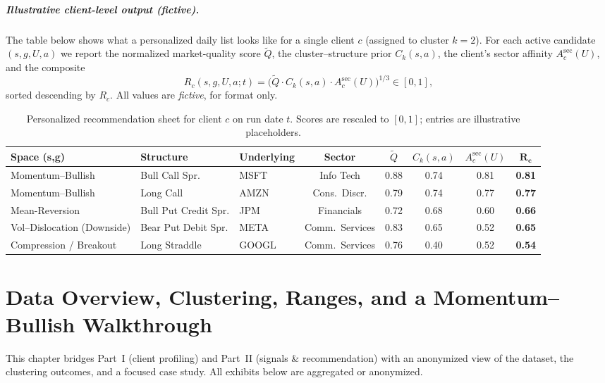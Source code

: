 \documentclass[12pt,a4paper]{report}
\begin{document}
\paragraph{Illustrative client-level output (fictive).}
The table below shows what a personalized daily list looks like for a single client $c$ (assigned to cluster $k=2$). For each active candidate $(s,g,U,a)$ we report the normalized market-quality score $\widetilde{Q}$, the cluster–structure prior $C_{k}(s,a)$, the client’s sector affinity $A^{\mathrm{sec}}_c(U)$, and the composite
\[
R_c(s,g,U,a;t)=\big(\widetilde{Q}\cdot C_{k}(s,a)\cdot A^{\mathrm{sec}}_c(U)\big)^{1/3}\in[0,1],
\]
sorted descending by $R_c$. All values are \emph{fictive}, for format only.

\begin{table}[h]
\centering
\begin{tabular}{lllc cccc}
\toprule
\textbf{Space (s,g)} & \textbf{Structure} & \textbf{Underlying} & \textbf{Sector} & $\widetilde{Q}$ & $C_{k}(s,a)$ & $A^{\mathrm{sec}}_c(U)$ & $\mathbf{R_c}$ \\
\midrule
Momentum–Bullish & Bull Call Spr. & MSFT & Info Tech & 0.88 & 0.74 & 0.81 & \textbf{0.81} \\
Momentum–Bullish & Long Call      & AMZN & Cons.\ Discr. & 0.79 & 0.74 & 0.77 & \textbf{0.77} \\
Mean-Reversion   & Bull Put Credit Spr. & JPM  & Financials & 0.72 & 0.68 & 0.60 & \textbf{0.66} \\
Vol–Dislocation (Downside) & Bear Put Debit Spr. & META & Comm.\ Services & 0.83 & 0.65 & 0.52 & \textbf{0.65} \\
Compression / Breakout & Long Straddle & GOOGL & Comm.\ Services & 0.76 & 0.40 & 0.52 & \textbf{0.54} \\
\bottomrule
\end{tabular}
\caption{Personalized recommendation sheet for client $c$ on run date $t$. Scores are rescaled to $[0,1]$; entries are illustrative placeholders.}
\label{tab:client_daily_reco}
\end{table}


\chapter{Data Overview, Clustering, Ranges, and a Momentum–Bullish Walkthrough}
\label{chap:overview_walkthrough}

This chapter bridges Part~I (client profiling) and Part~II (signals \& recommendation) with an anonymized view of the dataset, the clustering outcomes, and a focused case study. All exhibits below are aggregated or anonymized.
\end{document}
